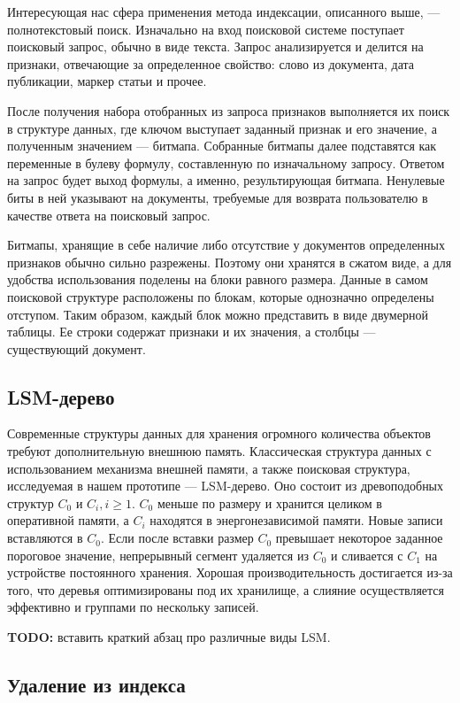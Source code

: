 Интересующая нас сфера применения метода индексации, описанного выше, — полнотекстовый
поиск. Изначально на вход поисковой системе поступает поисковый запрос, обычно в виде
текста. Запрос анализируется и делится на признаки, отвечающие за определенное 
свойство: слово из документа, дата публикации, маркер статьи и прочее.

После получения набора отобранных из запроса признаков выполняется
их поиск в структуре данных, где ключом выступает заданный признак и его значение,
а полученным значением — битмапа. Собранные битмапы далее подставятся как
переменные в булеву формулу, составленную по изначальному запросу. Ответом на
запрос будет выход формулы, а именно, результирующая битмапа. Ненулевые биты в 
ней указывают на документы, требуемые для возврата пользователю в качестве
ответа на поисковый запрос.

Битмапы, хранящие в себе наличие либо отсутствие у документов определенных 
признаков обычно сильно разрежены. Поэтому они хранятся в сжатом виде, а для
удобства использования поделены на блоки равного размера. Данные в самом
поисковой структуре расположены по блокам, которые однозначно
определены отступом. Таким образом, каждый блок можно представить в виде
двумерной таблицы\label{table}. Ее строки содержат признаки и их значения, а
столбцы — существующий документ.

\subsection{LSM-дерево}

Современные структуры данных для хранения огромного количества объектов требуют
дополнительную внешнюю память. Классическая структура данных с использованием механизма
внешней памяти, а также поисковая структура, исследуемая в нашем прототипе —
LSM-дерево. Оно состоит из древоподобных структур $C_0$ и $C_i, i \ge 1$.
$C_0$ меньше по размеру и хранится
целиком в оперативной памяти, а $C_i$ находятся в энергонезависимой памяти. Новые
записи вставляются в $C_0$. Если после вставки размер $C_0$ превышает некоторое заданное
пороговое значение, непрерывный сегмент удаляется из $C_0$ и сливается с $C_1$ на устройстве
постоянного хранения. Хорошая производительность достигается из-за того, что деревья
оптимизированы под их хранилище, а слияние осуществляется эффективно и группами по
нескольку записей.

\textbf{TODO:} вставить краткий абзац про различные виды LSM.

\subsection{Удаление из индекса}

